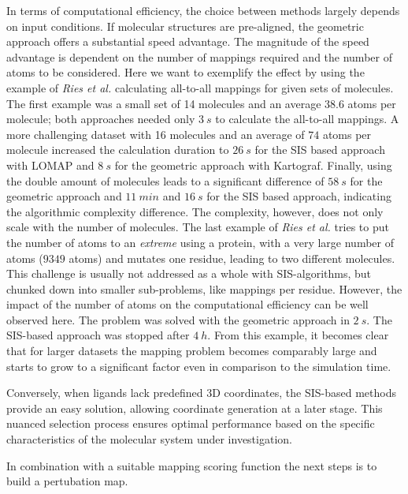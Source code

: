 \documentclass[9pt,bestpractices,pubversion]{livecoms}
\begin{document}
In terms of computational efficiency, the choice between methods largely depends on input conditions. If molecular structures are pre-aligned, the geometric approach offers a substantial speed advantage. The magnitude of the speed advantage is dependent on the number of mappings required and the number of atoms to be considered. Here we want to exemplify the effect by using the example of \textit{Ries et al.} calculating all-to-all mappings for given sets of molecules. The first example was a small set of 14 molecules and an average $38.6$ atoms per molecule; both approaches needed only $3~s$ to calculate the all-to-all mappings. A more challenging dataset with 16 molecules and an average of $74$ atoms per molecule increased the calculation duration to $26~s$ for the SIS based approach with LOMAP and $8~s$ for the geometric approach with Kartograf. Finally, using the double amount of molecules leads to a significant difference of $58~s$ for the geometric approach and $11~min$ and $16~s$ for the SIS based approach, indicating the algorithmic complexity difference. The complexity, however, does not only scale with the number of molecules. The last example of \textit{Ries et al.}  tries to put the number of atoms to an \textit{extreme} using a protein, with a very large number of atoms ($9349$ atoms) and mutates one residue, leading to two different molecules. This challenge is usually not addressed as a whole with SIS-algorithms, but chunked down into smaller sub-problems, like mappings per residue. However, the impact of the number of atoms on the computational efficiency can be well observed here. The problem was solved with the geometric approach in $2~s$. The SIS-based approach was stopped after $4~h$. \cite{ries2024kartograf} From this example, it becomes clear that for larger datasets the mapping problem becomes comparably large and starts to grow to a significant factor even in comparison to the simulation time.

Conversely, when ligands lack predefined 3D coordinates, the SIS-based methods provide an easy solution, allowing coordinate generation at a later stage. This nuanced selection process ensures optimal performance based on the specific characteristics of the molecular system under investigation. 

In combination with a suitable mapping scoring function the next steps is to build a pertubation map.
\end{document}
